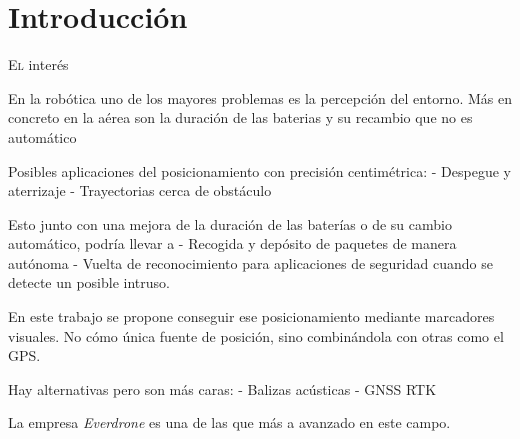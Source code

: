 \chapter{Introducción}\label{chp-02}

\lettrine[lraise=-0.1, lines=2, loversize=0.2]{E}{l} interés 

En la robótica uno de los mayores problemas es la percepción del entorno. Más en concreto en la aérea son la duración de las baterias y su recambio que no es automático

Posibles aplicaciones del posicionamiento con precisión centimétrica:
- Despegue y aterrizaje
- Trayectorias cerca de obstáculo

Esto junto con una mejora de la duración de las baterías o de su cambio automático, podría llevar a
- Recogida y depósito de paquetes de manera autónoma
- Vuelta de reconocimiento para aplicaciones de seguridad cuando se detecte un posible intruso.

En este trabajo se propone conseguir ese posicionamiento mediante marcadores visuales. No cómo única fuente de posición, sino combinándola con otras como el GPS.

Hay alternativas pero  son más caras:
- Balizas acústicas
- GNSS RTK


La empresa \textit{Everdrone} es una de las que más a avanzado en este campo. 


\endinput

